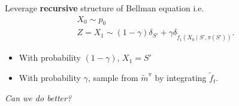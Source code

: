 \documentclass{beamer}
\begin{document}
    \begin{frame}
    \begin{blackblock}
    Leverage \textbf{recursive} structure of Bellman equation i.e.
    \begin{gather*}
        X_{0} \sim p_{0} \\
        Z = X_1 \sim (1 - \gamma)\delta_{S'} + \gamma \delta_{\tilde{f}_1(X_0 \mid S', \pi(S'))}
    .\end{gather*}
    \end{blackblock}
    \begin{itemize}
        \item With probability \( (1 - \gamma) \), \( X_{1} = S' \)
        \item With probability \( \gamma \), sample from \( \tilde{m}^{\pi} \) by integrating \( \tilde{f}_t \).
    \end{itemize}
    \vspace*{1cm}
        \begin{center}
            \emph{Can we do better?}
        \end{center}
    \end{frame}
    
\end{document}
